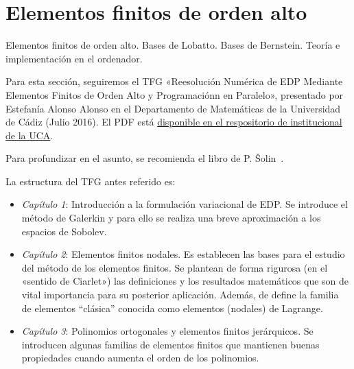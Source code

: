 \section{Elementos finitos de orden alto}

\begin{contenidos}
  Elementos finitos de orden alto. Bases de Lobatto. Bases de
  Bernstein. Teoría e implementación en el ordenador.
\end{contenidos}


Para esta sección, seguiremos el TFG «Reesolución Numérica de EDP
Mediante Elementos Finitos de Orden Alto y Programaciónn en Paralelo»,
presentado por Estefanía Alonso Alonso en el Departamento de
Matemáticas de la Universidad de Cádiz (Julio 2016). El PDF está
\href{https://rodin.uca.es/xmlui/bitstream/handle/10498/19255/TFG-EstefaniaAlonso.pdf}{disponible
  en el respositorio de institucional de la UCA}.

Para profundizar en el asunto, se recomienda el libro de P. \v{S}olin~\cite{solin_higher-order_2004}.

La estructura del TFG antes referido es:
\begin{itemize}

\item \textit{Capítulo 1}: Introducción a la formulación variacional de EDP.
  Se introduce el método de Galerkin y para ello se realiza una breve
  aproximación a los espacios de Sobolev.
\item \textit{Capítulo 2}: Elementos finitos nodales. Es establecen
  las bases para el estudio del método de los elementos finitos.  Se
  plantean de forma rigurosa (en el «sentido de Ciarlet») las
  definiciones y los resultados matemáticos que son de vital
  importancia para su posterior aplicación. Además, de define la
  familia de elementos “clásica” conocida como elementos (nodales) de
  Lagrange.
\item \textit{Capítulo 3}: Polinomios ortogonales y elementos finitos
  jerárquicos.  Se introducen algunas familias de elementos finitos
  que mantienen buenas propiedades cuando aumenta el orden de los
  polinomios.

 \end{itemize}

